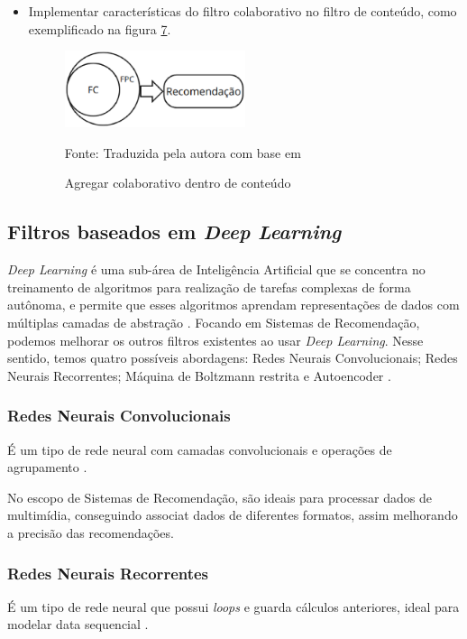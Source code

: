 \begin{itemize}
    \item Implementar características do filtro colaborativo no filtro de conteúdo, como exemplificado na figura
    \hyperref[fig:cbfcf]{7}.
    \begin{figure}[H]
        \centering
        \includegraphics[width=0.5\textwidth]{figuras/cbfcf2.eps}
        \caption{Agregar colaborativo dentro de conteúdo}
        \label{fig:cbfcf}
        \small Fonte: Traduzida pela autora com base em \cite{thorat2015survey}
    \end{figure}
\end{itemize}

\subsection{Filtros baseados em \textit{Deep Learning}}\label{subsec:filtrodeep}
\textit{Deep Learning} é uma sub-área de Inteligência Artificial que se concentra no treinamento de algoritmos para 
realização de tarefas complexas de forma autônoma, e permite que esses algoritmos aprendam representações de 
dados com múltiplas camadas de abstração \cite{LeCun2015}. Focando em Sistemas de Recomendação, 
podemos melhorar os outros filtros existentes ao usar \textit{Deep Learning}. Nesse sentido, temos quatro possíveis 
abordagens: Redes Neurais Convolucionais; Redes Neurais Recorrentes; Máquina de Boltzmann restrita e Autoencoder 
\cite{elSisi2020}.

\subsubsection{Redes Neurais Convolucionais}\label{subsubsec:rnc}
É um tipo de rede neural com camadas convolucionais e operações de agrupamento \cite{elSisi2020}.

No escopo de Sistemas de Recomendação, são ideais para processar dados de multimídia, conseguindo associat dados de 
diferentes formatos, assim melhorando a precisão das recomendações.

\subsubsection{Redes Neurais Recorrentes}\label{subsubsec:rnr}
É um tipo de rede neural que possui \textit{loops} e guarda cálculos anteriores, ideal para modelar data sequencial 
\cite{elSisi2020}.

